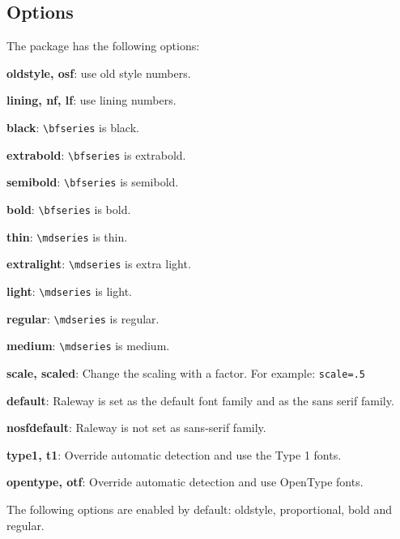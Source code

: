 \documentclass[10pt,a4paper,english]{article}
\begin{document}
\begin{multicols}{2}
\section{Options}
The package has the following options:
\begin{itemize*}
	\item \textbf{oldstyle, osf}:  use old style numbers.
	\item \textbf{lining, nf, lf}: use lining numbers.
	\item \textbf{black}:          \texttt{\textbackslash bfseries} is black.
	\item \textbf{extrabold}:      \texttt{\textbackslash bfseries} is extrabold.
	\item \textbf{semibold}:       \texttt{\textbackslash bfseries} is semibold.
	\item \textbf{bold}:           \texttt{\textbackslash bfseries} is bold.
	\item \textbf{thin}:           \texttt{\textbackslash mdseries} is thin.
	\item \textbf{extralight}:     \texttt{\textbackslash mdseries} is extra light.
	\item \textbf{light}:          \texttt{\textbackslash mdseries} is light.
	\item \textbf{regular}:        \texttt{\textbackslash mdseries} is regular.
	\item \textbf{medium}:         \texttt{\textbackslash mdseries} is medium.
	\item \textbf{scale, scaled}:  Change the scaling with a factor. For example:  \texttt{scale=.5}
	\item \textbf{default}:        Raleway is set as the default font family and as the sans serif family.
	\item \textbf{nosfdefault}:    Raleway is not set as sans-serif family.
	\item \textbf{type1, t1}:      Override automatic detection and use the Type 1 fonts.
	\item \textbf{opentype, otf}:  Override automatic detection and use OpenType fonts.
\end{itemize*}
The following options are enabled by default: oldstyle, proportional, bold and regular.


\end{multicols}
\end{document}
